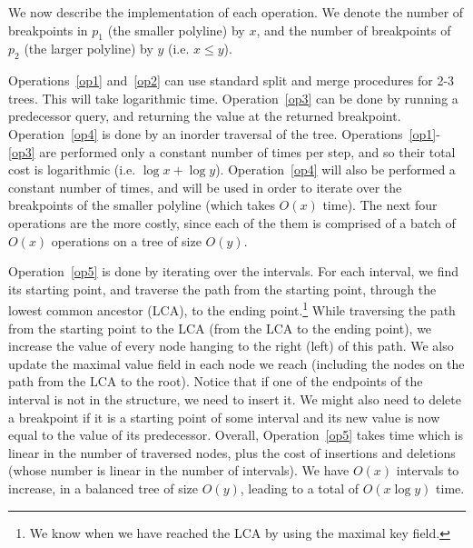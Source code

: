 \documentclass[11pt,a4paper]{article}
\theoremstyle{definition}
\theoremstyle{remark}
\begin{document}
We now describe the implementation of each operation. We denote the number of breakpoints in $p_1$ (the smaller polyline) by $x$, and the number of breakpoints of $p_2$ (the larger polyline) by $y$ (i.e. $x \leq y$). 

 Operations~\ref{op1} and~\ref{op2} can use standard split and merge procedures for 2-3 trees. This will take logarithmic time. 
 Operation~\ref{op3} can be done by running a predecessor query, and returning the value at the returned breakpoint. 
 Operation~\ref{op4} is done by an inorder traversal of the tree. 
Operations~\ref{op1}-\ref{op3} are performed only a constant number of times per step, and so their total cost is logarithmic (i.e. $\log x + \log y$). Operation~\ref{op4} will also be performed a constant number of times, and will be used in order to iterate over the breakpoints of the smaller polyline (which takes $O(x)$ time). The next four operations are the more costly, since each of the them is comprised of a batch of $O(x)$ operations on a tree of size $O(y)$.

Operation~\ref{op5} is done by iterating over the intervals. For each interval, we find its starting point, and traverse the path from the starting point, through the lowest common ancestor (LCA), to the ending point.\footnote{We know when we have reached the LCA by using the maximal key field.} While traversing the path from the starting point to the LCA (from the LCA to the ending point), we increase the value of every node hanging to the right (left) of this path. We also update the maximal value field in each node we reach (including the nodes on the path from the LCA to the root). Notice that if one of the endpoints of the interval is not in the structure, we need to insert it. We might also need to delete a breakpoint if it is a starting point of some interval and its new value is now equal to the value of its predecessor. Overall, Operation~\ref{op5} takes time which is linear in the number of traversed nodes, plus the cost of insertions and deletions (whose number  is linear in the number of intervals). We have $O(x)$ intervals to increase, in a balanced tree of size $O(y)$, leading to a total of $O(x \log y)$ time.

\end{document}
